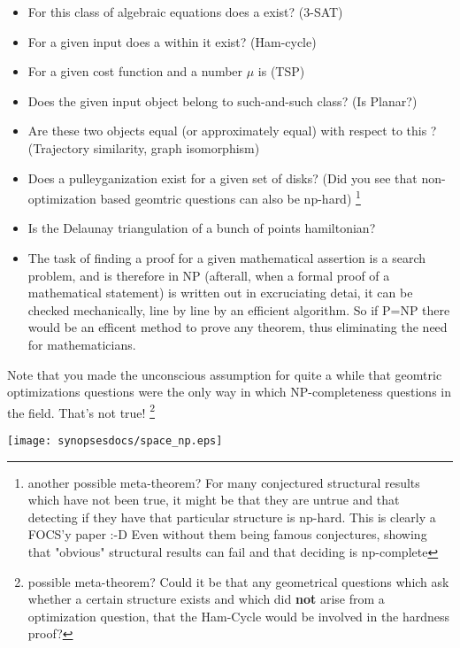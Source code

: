 \begin{itemize}
\item For this class of algebraic equations does a  exist? (3-SAT)
\item For a given input does a  within it exist? (Ham-cycle)
\item For a given cost function and a number \(\mu\) is  (TSP)
\item Does the given input object belong to such-and-such class?  (Is Planar?)
\item Are these two objects equal (or approximately equal) with respect to this ?
  (Trajectory similarity, graph isomorphism)
\item Does a pulleyganization exist for a given set of disks? (Did you see that non-optimization
  based geomtric questions can also be np-hard)
  \footnote{another possible meta-theorem? For many conjectured structural results which have
    not been true, it might be that they are untrue and that detecting if they have that particular
    structure is np-hard. This is clearly a FOCS'y paper :-D Even without
    them being famous conjectures, showing that "obvious" structural results can fail and
    that deciding is np-complete}
\item Is the Delaunay triangulation of a bunch of points hamiltonian?
\item The task of finding a proof for a given mathematical assertion is a search problem,
and is therefore in NP (afterall, when a formal proof of a mathematical statement) is written
out in excruciating detai, it can be checked mechanically, line by line by 
an efficient algorithm. So if P=NP there would be an efficent method to prove 
any theorem, thus eliminating the need for mathematicians.
\end{itemize}

\newchunk 

Note that you made the unconscious assumption for quite a while that geomtric optimizations
questions were the only way in which NP-completeness questions in the field. That's not true!
\footnote{possible meta-theorem? Could it be that any geometrical questions which ask whether a
  certain structure exists and which did \textbf{not} arise from a optimization question, that
  the Ham-Cycle would be involved in the hardness proof?}

\begin{center}
\texttt{[image: synopsesdocs/space\_np.eps]}
\end{center}

